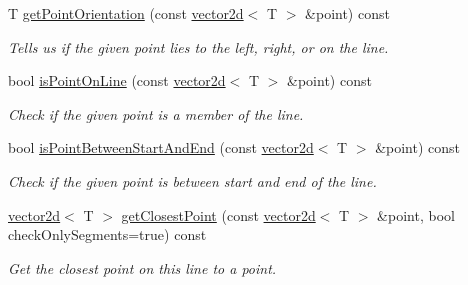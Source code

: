 \begin{DoxyCompactItemize}
T \hyperlink{classirr_1_1core_1_1line2d_a85405d08c6e3ea55cdb39b60484f7275}{get\+Point\+Orientation} (const \hyperlink{classirr_1_1core_1_1vector2d}{vector2d}$<$ T $>$ \&point) const
\begin{DoxyCompactList}\small\item\em Tells us if the given point lies to the left, right, or on the line. \end{DoxyCompactList}\item 
bool \hyperlink{classirr_1_1core_1_1line2d_a00fcd43ae43b8b7e249b32206aaa22ff}{is\+Point\+On\+Line} (const \hyperlink{classirr_1_1core_1_1vector2d}{vector2d}$<$ T $>$ \&point) const
\begin{DoxyCompactList}\small\item\em Check if the given point is a member of the line. \end{DoxyCompactList}\item 
bool \hyperlink{classirr_1_1core_1_1line2d_a5c986f9749f57364757f0f6c749922ce}{is\+Point\+Between\+Start\+And\+End} (const \hyperlink{classirr_1_1core_1_1vector2d}{vector2d}$<$ T $>$ \&point) const
\begin{DoxyCompactList}\small\item\em Check if the given point is between start and end of the line. \end{DoxyCompactList}\item 
\hyperlink{classirr_1_1core_1_1vector2d}{vector2d}$<$ T $>$ \hyperlink{classirr_1_1core_1_1line2d_af049709fbc870bdc317ec27df95280cb}{get\+Closest\+Point} (const \hyperlink{classirr_1_1core_1_1vector2d}{vector2d}$<$ T $>$ \&point, bool check\+Only\+Segments=true) const
\begin{DoxyCompactList}\small\item\em Get the closest point on this line to a point. \end{DoxyCompactList}\end{DoxyCompactItemize}
